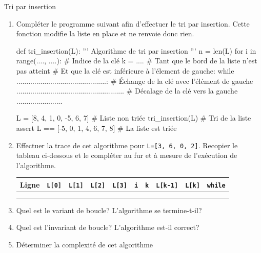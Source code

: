 \begin{exercice_cours}{Tri par insertion}{}
	\begin{enumerate}
		\item 	Compléter le programme suivant afin d'effectuer le tri par insertion. Cette fonction modifie la liste en place et ne renvoie donc rien.


	\begin{CodePythontexAlt}[TaillePolice=\large, Largeur=1\linewidth,Centre,PremLigne=1]{}
		def tri_insertion(L):
			''' Algorithme de tri par insertion '''
			n = len(L)
			for i in range(...., ....):
				# Indice de la clé
				k = .... 				
				# Tant que le bord de la liste n'est pas atteint
				# Et que la clé est inférieure à l'élement de gauche:
				while .............................................:
					# Échange de la clé avec l'élément de gauche
					...................................................... 
					# Décalage de la clé vers la gauche
					....................... 
		
		L = [8, 4, 1, 0, -5, 6, 7]				 # Liste non triée
		tri_insertion(L)					   # Tri de la liste
		assert L == [-5, 0, 1, 4, 6, 7, 8] 	# La liste est triée
		\end{CodePythontexAlt}


		\item Effectuer la trace de cet algorithme pour \verb+L=[3, 6, 0, 2]+. Recopier le tableau ci-dessous et le compléter au fur et à mesure de l'exécution de l'algorithme.
		
		\begin{center}
			
		\begin{tabular}{|c|c|c|c|c|c|c|c|c|c|}
			\hline
			Ligne & \verb+L[0]+ & \verb+L[1]+ & \verb+L[2]+ & \verb+L[3]+ & \verb+i+ & \verb+k+ & \verb+L[k-1]+ & \verb+L[k]+ & \verb+while+ \\
			\hline
			&&&&&&&&&\\ \hline
&&&&&&&&&\\ \hline

		\end{tabular}
	\end{center}

	\item Quel est le variant de boucle? L'algorithme se termine-t-il? \dotfill{}
	\dotfill{}

	\dotfill{}

	\dotfill{}

	\dotfill{}

	\dotfill{}

	\item Quel est l'invariant de boucle? L'algorithme est-il correct? \dotfill{}
	
	\dotfill{}

	\dotfill{}

	\dotfill{}

	\dotfill{}

	\item Déterminer la complexité de cet algorithme \dotfill{}
	\end{enumerate}

\end{exercice_cours}

